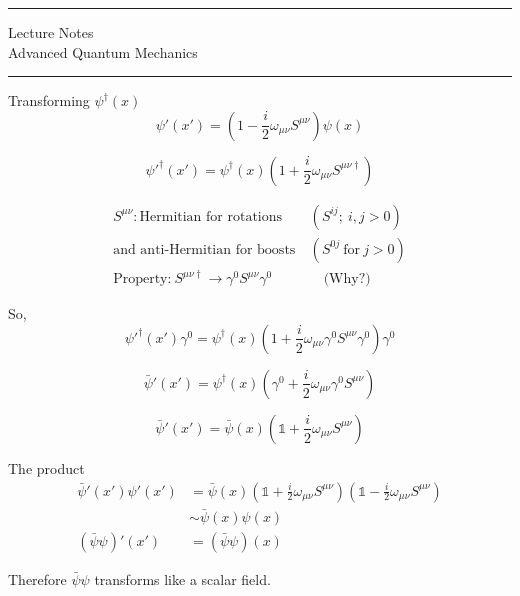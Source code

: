 \documentclass[11pt]{article}
\author{Aayush Arya}
\title{}
\date{January 23, 2023}
\begin{document}
	\maketitle
	
	\hrule
	\begin{center}
		Lecture Notes\\
		Advanced Quantum Mechanics
	\end{center}
	\hrule 
	
	\vspace{11pt}
	Transforming $\psi^\dagger(x)$ \[ \psi'(x') = \left(1 - \frac{i}{2}\omega_{\mu \nu}S^{\mu\nu}\right) \psi(x)\]
	
	\[ \psi'^\dagger (x') = \psi^\dagger(x)\left(1 + \frac{i}{2} \omega_{\mu\nu}S^{\mu\nu \dagger} \right)\]

	\begin{align*}
		S^{\mu\nu}: \text{Hermitian for rotations}&\ (S^{ij};\ i,j > 0)\\
		 \text{and anti-Hermitian for boosts}&\ (S^{0j}\  \text{for}\ j > 0)\\
		 \text{Property:}\ S^{\mu\nu\dagger} \rightarrow \gamma^0 S^{\mu\nu} \gamma^0 &\ \quad \text{(Why?)}
	\end{align*}
	
	So, \[\psi'^\dagger(x')\gamma^0 = \psi^\dagger(x) \left(1 + \frac{i}{2}\omega_{\mu \nu}\gamma^0 S^{\mu\nu}\gamma^0 \right) \gamma^0\]
	
	\[ \bar{\psi}'(x') = \psi^\dagger (x) \left( \gamma^0 + \frac{i}{2}\omega_{\mu\nu}\gamma^0 S^{\mu\nu}\right)\]
	
	
	
	
	\[ \bar{\psi}'(x') = \bar{\psi}(x) \left( \mathbb{1} + \frac{i}{2}\omega_{\mu\nu} S^{\mu\nu}\right) \]
	
	The product
	\begin{align*}
		\bar{\psi}'(x') \psi'(x') &= \bar{\psi}(x) \left(\mathbb{1} + \frac{i}{2}\omega_{\mu\nu} S^{\mu\nu} \right) \left( \mathbb{1} - \frac{i}{2}\omega_{\mu\nu}S^{\mu\nu} \right)\\
				& \sim \bar{\psi}(x)\psi(x)\\
		(\bar{\psi}\psi)'(x') &= (\bar{\psi}\psi) (x)
	\end{align*}

Therefore $\bar{\psi}\psi$ transforms like a scalar field.
\end{document}
